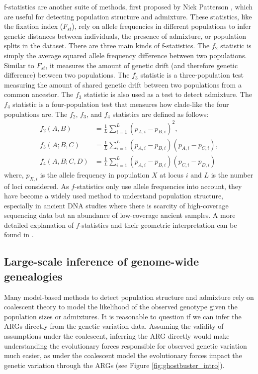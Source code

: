 f-statistics are another suite of methods, first proposed by Nick Patterson \cite{reich2009reconstructing,reich2012reconstructing,patterson2012ancient,haak2015massive,durand2011testing}, which are useful for detecting population structure and admixture. These statistics, like the fixation index (\(F_{st}\)), rely on allele frequencies in different populations to infer genetic distances between individuals, the presence of admixture, or population splits in the dataset. There are three main kinds of f-statistics. The \(f_2\) statistic is simply the average squared allele frequency difference between two populations. Similar to \(F_{st}\), it measures the amount of genetic drift (and therefore genetic difference) between two populations. The \(f_3\) statistic is a three-population test measuring the amount of shared genetic drift between two populations from a common ancestor. The \(f_3\) statistic is also used as a test to detect admixture. The \(f_4\) statistic is a four-population test that measures how clade-like the four populations are. The \(f_2\), \(f_3\), and \(f_4\) statistics are defined as follows:
\begin{equation}
\begin{aligned}
    f_2(A, B) &= \frac{1}{L} \sum_{i=1}^{L} (p_{A,i} - p_{B,i})^2, \\
    f_3(A; B, C) &= \frac{1}{L} \sum_{i=1}^{L} (p_{A,i} - p_{B,i})(p_{A,i} - p_{C,i}), \\
    f_4(A, B; C, D) &= \frac{1}{L} \sum_{i=1}^{L} (p_{A,i} - p_{B,i})(p_{C,i} - p_{D,i})
\end{aligned}
\end{equation}
where, \( p_{X,i} \) is the allele frequency in population \( X \) at locus \( i \) and \( L \) is the number of loci considered. As \( f \)-statistics only use allele frequencies into account, they have become a widely used method to understand population structure, especially in ancient DNA studies where there is scarcity of high-coverage sequencing data but an abundance of low-coverage ancient samples. A more detailed explanation of \( f \)-statistics and their geometric interpretation can be found in \cite{peter2022geometric}.

\subsection{Large-scale inference of genome-wide genealogies}
\label{sec:ch1-arg-inference}
Many model-based methods to detect population structure and admixture rely on coalescent theory to model the likelihood of the observed genotype given the population sizes or admixtures. It is reasonable to question if we can infer the ARGs directly from the genetic variation data. Assuming the validity of assumptions under the coalescent, inferring the ARG directly would make understanding the evolutionary forces responsible for observed genetic variation much easier, as under the coalescent model the evolutionary forces impact the genetic variation through the ARGs (see Figure \ref{fig:ghostbuster_intro}).

